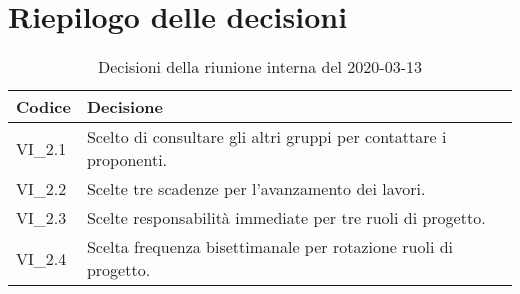 \section{Riepilogo delle decisioni}
\begin{longtable}{ 
	 >{\centering}p{} >{}p{} }
	
	\caption{Decisioni della riunione interna del 2020-03-13}\\	
	
	\textbf{\color{white}Codice} & 
	\textbf{\color{white}Decisione} 
	\tabularnewline  
	\endhead
	
	VI\_2.1 & Scelto di consultare gli altri gruppi per contattare i proponenti. \\
	VI\_2.2 & Scelte tre scadenze per l'avanzamento dei lavori. \\
	VI\_2.3 & Scelte responsabilità immediate per tre ruoli di progetto. \\
	VI\_2.4 & Scelta frequenza bisettimanale per rotazione ruoli di progetto. \\
	
\end{longtable}